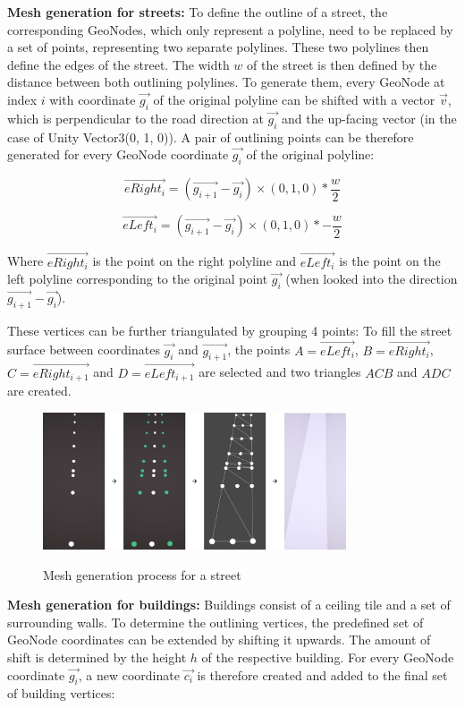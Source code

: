 \newpage

\textbf{Mesh generation for streets:} To define the outline of a street, the corresponding GeoNodes, which only represent a polyline, need to be replaced by a set of points, representing two separate polylines. These two polylines then define the edges of the street. The width $w$ of the street is then defined by the distance between both outlining polylines. To generate them, every GeoNode at index $i$ with coordinate $\vec{g_{i}}$ of the original polyline can be shifted with a vector $\vec{v}$, which is perpendicular to the road direction at $\vec{g_{i}}$ and the up-facing vector (in the case of Unity Vector3(0, 1, 0)). A pair of outlining points can be therefore generated for every GeoNode coordinate $\vec{g_{i}}$ of the original polyline:

\[\vec{eRight_{i}} = (\vec{g_{i + 1}} - \vec{g_{i}}) \times (0, 1, 0) * \frac{w}{2}\]

\[\vec{eLeft_{i}} = (\vec{g_{i + 1}} - \vec{g_{i}}) \times (0, 1, 0) * - \frac{w}{2}\]

Where $\vec{eRight_{i}}$ is the point on the right polyline and $\vec{eLeft_{i}}$ is the point on the left polyline corresponding to the original point $\vec{g_{i}}$ (when looked into the direction $\vec{g_{i + 1}} - \vec{g_{i}}$).

These vertices can be further triangulated by grouping 4 points: To fill the street surface between coordinates $\vec{g_{i}}$ and $\vec{g_{i + 1}}$, the points $A = \vec{eLeft_{i}}$, $B = \vec{eRight_{i}}$, $C = \vec{eRight_{i + 1}}$ and $D = \vec{eLeft_{i + 1}}$ are selected and two triangles $ACB$ and $ADC$ are created.

\begin{figure}[H]
	\centering
	\includegraphics[width=0.8\textwidth]{images/street_mesh_generation.png}\\
	\caption{Mesh generation process for a street}
\end{figure}

\textbf{Mesh generation for buildings:} Buildings consist of a ceiling tile and a set of surrounding walls. To determine the outlining vertices, the predefined set of GeoNode coordinates can be extended by shifting it upwards. The amount of shift is determined by the height $h$ of the respective building. For every GeoNode coordinate $\vec{g_{i}}$, a new coordinate $\vec{c_{i}}$ is therefore created and added to the final set of building vertices:


